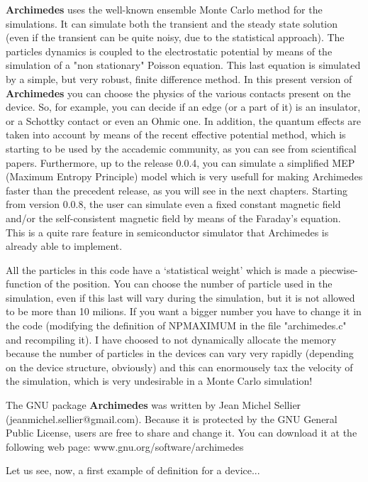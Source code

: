 \documentclass[12pt]{book}
\begin{document}
\textbf{Archimedes} uses the well-known ensemble Monte Carlo method for the simulations. It can simulate both the transient and the steady state solution (even if the transient can be quite noisy, due to the statistical approach). The particles dynamics is coupled to the electrostatic potential by means of the simulation of a "non stationary" Poisson equation. This last equation is simulated by a simple, but very robust, finite difference method.
In this present version of \textbf{Archimedes} you can choose the physics of the various contacts present on the device. So, for example, you can decide if an edge (or a part of it) is an insulator, or a Schottky contact or even an Ohmic one. In addition, the quantum effects are taken into account by means of the recent effective potential method, which is starting to be used by the accademic community, as you can see from scientifical papers. Furthermore, up to the release 0.0.4, you can simulate a simplified MEP (Maximum Entropy Principle) model which is very usefull for making Archimedes faster than the precedent release, as you will see in the next chapters. Starting from version 0.0.8, the user can simulate even a fixed constant magnetic field and/or the self-consistent magnetic field by means of the Faraday's equation. This is a quite rare feature in semiconductor simulator that Archimedes is already able to implement.


All the particles in this code have a `statistical weight' which is made a piecwise-function of the position. You can choose the number of particle used in the simulation, even if this last will vary during the simulation, but it is not allowed to be more than 10 milions. If you want a bigger number you have to change it in the code (modifying the definition of NPMAXIMUM in the file "archimedes.c" and recompiling it). I have choosed to not dynamically allocate the memory because the number of particles in the devices can vary very rapidly (depending on the device structure, obviously) and this can enormousely tax the velocity of the simulation, which is very undesirable in a Monte Carlo simulation!

The GNU package \textbf{Archimedes} was written by Jean Michel Sellier (jeanmichel.sellier@gmail.com). Because it is protected by the GNU General Public License, users are free to share and change it. You can download it at the following web page:
www.gnu.org/software/archimedes

Let us see, now, a first example of definition for a device...
\end{document}
